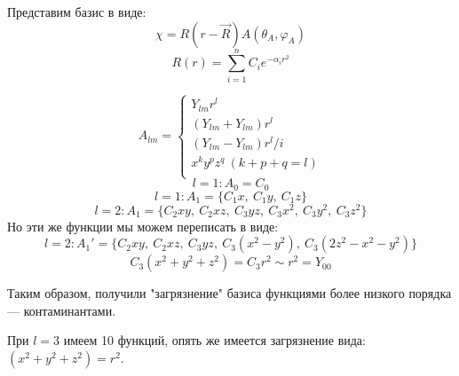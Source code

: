 \documentclass[a4paper,14pt]{extarticle}
\begin{document}
Представим базис в виде:
$$ \chi = R( r - \vec{R} ) A( \theta_A, \varphi_A ) $$
$$ R(r) = \sum_{i=1}^n C_i e^{ -\alpha_i r^2 } $$

\begin{equation*}
 A_{lm} = \begin{cases} Y_{lm} r^l \\
		      (Y_{lm} + Y_{lm})r^l \\
		      (Y_{lm} - Y_{lm})r^l/i \\
		       x^k y^p z^q\ ( k + p + q = l ) \\
		       \end{cases}
\end{equation*}
$$ l = 1: A_0 = C_0 $$
$$ l = 1: A_1 = \{ C_1x,\ C_1y,\ C_1z \}$$
$$ l = 2: A_1 = \{ C_2xy,\ C_2xz,\ C_3yz,\ C_3x^2,\ C_3y^2,\ C_3z^2 \}$$
Но эти же функции мы можем переписать в виде:
$$ l = 2: A_1' = \{ C_2xy,\ C_2xz,\ C_3yz,\ C_3 ( x^2 - y^2 ),\ C_3( 2z^2 - x^2 - y^2 ) \}$$
$$ C_3 ( x^2 + y^2 + z^2 ) = C_3 r^2 \sim r^2 = Y_{00} $$

Таким образом, получили "загрязнение" базиса функциями более низкого порядка --- контаминантами.

При $ l = 3 $ имеем 10 функций, опять же имеется загрязнение вида: $( x^2 + y^2 + z^2 ) = r^2$.
\end{document}
